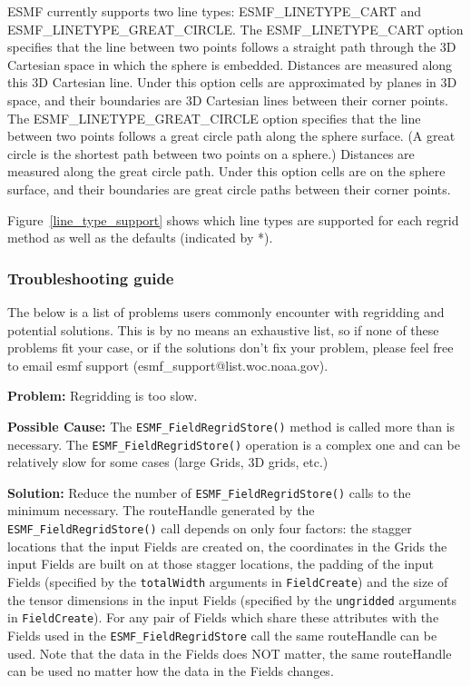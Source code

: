 ESMF currently supports two line types: ESMF\_LINETYPE\_CART and ESMF\_LINETYPE\_GREAT\_CIRCLE. The ESMF\_LINETYPE\_CART option 
specifies that the line between two points follows a straight path through the 3D Cartesian space in which the sphere is embedded.
Distances are measured along 
this 3D Cartesian line. Under this option cells are approximated by planes in 3D space, and their boundaries are 3D Cartesian lines
between their corner points.  The ESMF\_LINETYPE\_GREAT\_CIRCLE option specifies that the line between two points follows
a great circle path along the sphere surface. (A great circle is the shortest path between two points on a sphere.) 
Distances are measured along the great circle path. Under this option cells are on the sphere surface, and their boundaries 
are great circle paths between their corner points. 

Figure~\ref{line_type_support} shows which line types are supported for each regrid method as well as the defaults (indicated by *). 

\subsubsection{Troubleshooting guide}

 The below is a list of problems users commonly encounter with regridding and potential solutions. 
 This is by no means an exhaustive list, so if none of these problems fit your case, or if the solutions
 don't fix your problem, please feel free to email esmf support (esmf\_support@list.woc.noaa.gov).

 \bigskip
 
 {\bf Problem:} Regridding is too slow.

 \medskip

 {\bf Possible Cause:} The {\tt ESMF\_FieldRegridStore()} method is called more than is necessary. \newline
 The {\tt ESMF\_FieldRegridStore()} operation is a complex one and can be 
 relatively slow for some cases (large Grids, 3D grids, etc.) 
 
 \smallskip

 {\bf Solution:} Reduce the number of {\tt ESMF\_FieldRegridStore()} calls to the minimum necessary. The
 routeHandle generated by the {\tt ESMF\_FieldRegridStore()} call depends on only four factors: the 
 stagger locations that the input Fields are created on, the coordinates in the Grids the input Fields
 are built on at those stagger locations, the padding of the input Fields 
 (specified by the {\tt totalWidth} arguments in {\tt FieldCreate}) and the size of the tensor
 dimensions in the input Fields (specified by the {\tt ungridded} arguments in {\tt FieldCreate}). 
 For any pair of Fields which share these attributes with the Fields used in the
 {\tt ESMF\_FieldRegridStore} call  the same routeHandle can be used. Note that the data in the 
 Fields does NOT matter, the same routeHandle can be used no matter how the data in the Fields changes.

